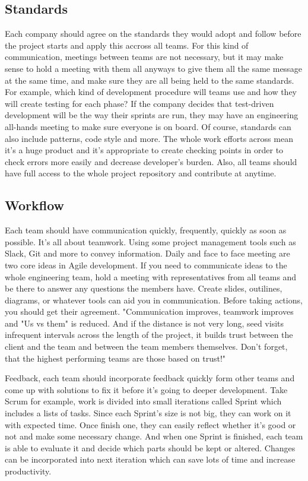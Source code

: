 \documentclass[sigplan,screen]{acmart}
\begin{document}
\subsection{Standards} 
Each company should agree on the standards they would adopt and follow before the project starts and apply this accross all teams. For this kind of communication, meetings between teams are not necessary, but it may make sense to hold a meeting with them all anyways to give them all the same message at the same time, and make sure they are all being held to the same standards. For example, which kind of development procedure will teams use and how they will create testing for each phase? If the company decides that test-driven development will be the way their sprints are run, they may have an engineering all-hands meeting to make sure everyone is on board. Of course, standards can also include patterns, code style and more. The whole work efforts across mean it's a huge product and it's appropriate to create checking points in order to check errors more easily and decrease developer's burden. Also, all teams should have full access to the whole project repository and contribute at anytime.

\subsection{Workflow}
Each team should have communication quickly, frequently, quickly as soon as possible. It's all about teamwork. Using some project management tools such as Slack, Git and more to convey information. Daily and face to face meeting are two core ideas in Agile development. If you need to communicate ideas to the whole engineering team, hold a meeting with representatives from all teams and be there to answer any questions the members have. Create slides, outilines, diagrams, or whatever tools can aid you in communication. \cite{Lulit} Before taking actions, you should get their agreement. "Communication improves, teamwork improves and "Us vs them" is reduced. And if the distance is not very long, seed visits infrequent intervals across the length of the project, it builds trust between the client and the team and between the team members themselves. Don't forget, that the highest performing teams are those based on trust!"\cite{David}

Feedback, each team should incorporate feedback quickly form other teams and come up with solutions to fix it before it's going to deeper development. Take Scrum for example, work is divided into small iterations called Sprint which includes a lists of tasks. Since each Sprint's size is not big, they can work on it with expected time. Once finish one, they can easily reflect whether it's good or not and make some necessary change. And when one Sprint is finished, each team is able to evaluate it and decide which parts should be kept or altered. Changes can be incorporated  into next iteration which can save lots of time and increase productivity.
\end{document}
